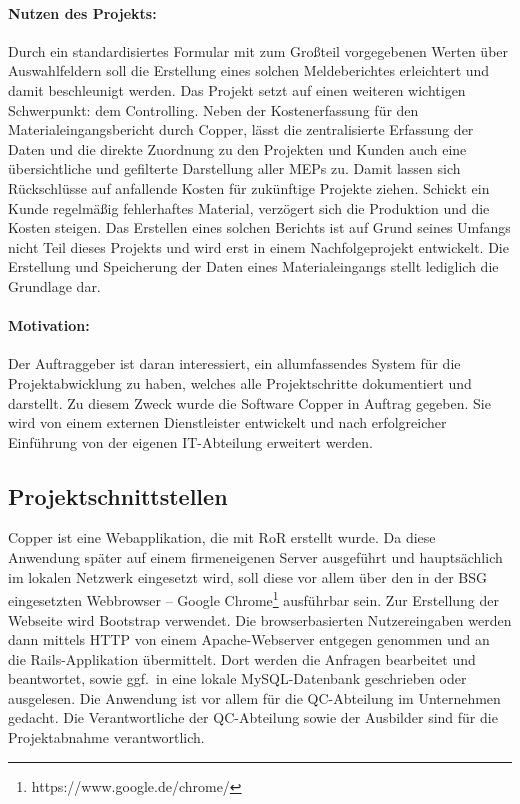 \paragraph*{Nutzen des Projekts: } Durch ein standardisiertes Formular mit zum Großteil vorgegebenen Werten über Auswahlfeldern soll die Erstellung eines solchen Meldeberichtes erleichtert und damit beschleunigt werden. Das Projekt setzt auf einen weiteren wichtigen Schwerpunkt: dem Controlling. Neben der Kostenerfassung für den Materialeingangsbericht durch Copper, lässt die zentralisierte Erfassung der Daten und die direkte Zuordnung zu den Projekten und Kunden auch eine übersichtliche und gefilterte Darstellung aller \ac{MEP}s zu. Damit lassen sich Rückschlüsse auf anfallende Kosten für zukünftige Projekte ziehen. Schickt ein Kunde regelmäßig fehlerhaftes Material, verzögert sich die Produktion und die Kosten steigen. Das Erstellen eines solchen Berichts ist auf Grund seines Umfangs nicht Teil dieses Projekts und wird erst in einem Nachfolgeprojekt entwickelt. Die Erstellung und Speicherung der Daten eines Materialeingangs stellt lediglich die Grundlage dar.

\paragraph*{Motivation: } Der Auftraggeber ist daran interessiert, ein allumfassendes System für die Projektabwicklung zu haben, welches alle Projektschritte dokumentiert und darstellt. Zu diesem Zweck wurde die Software Copper in Auftrag gegeben. Sie wird von einem externen Dienstleister entwickelt und nach erfolgreicher Einführung von der eigenen IT-Abteilung erweitert werden.

\subsection{Projektschnittstellen} 
\label{sec:Projektschnittstellen}
Copper ist eine Webapplikation, die mit \ac{RoR} erstellt wurde. Da diese Anwendung später auf einem firmeneigenen Server ausgeführt und hauptsächlich im lokalen Netzwerk eingesetzt wird, soll diese vor allem über den in der \ac{BSG} eingesetzten Webbrowser – Google Chrome\footnote{https://www.google.de/chrome/} ausführbar sein. Zur Erstellung der Webseite wird \acs{Bootstrap} verwendet. Die browserbasierten Nutzereingaben werden dann mittels \acs{HTTP} von einem Apache-Webserver entgegen genommen und an die \acs{Rails}-Applikation übermittelt. Dort werden die Anfragen bearbeitet und beantwortet, sowie ggf.\ in eine lokale \acs{MySQL}-Datenbank geschrieben oder ausgelesen. Die Anwendung ist vor allem für die \ac{QC}-Abteilung im Unternehmen gedacht. Die Verantwortliche der \ac{QC}-Abteilung sowie der Ausbilder sind für die Projektabnahme verantwortlich.

